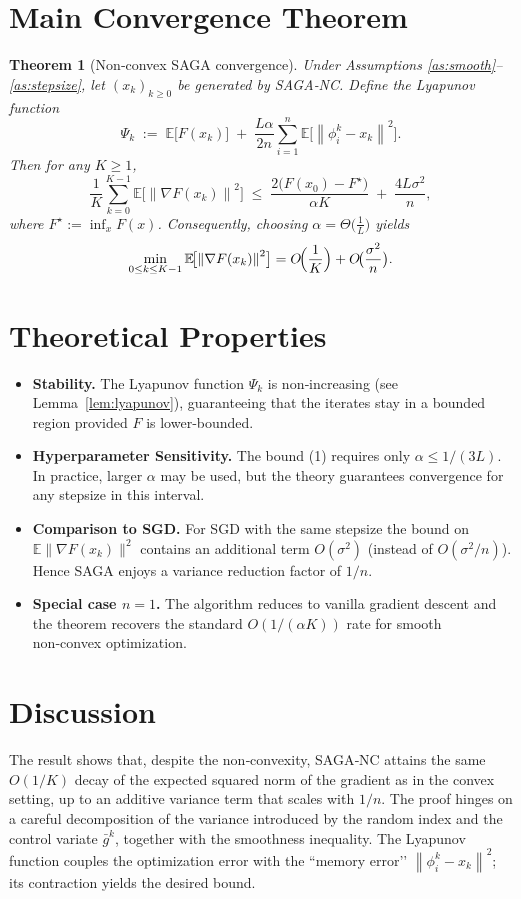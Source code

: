 \documentclass{article}
\newtheorem{theorem}{Theorem}
\newcommand{\E}{\mathbb{E}}
\newcommand{\norm}[1]{\left\lVert#1\right\rVert}
\begin{document}
\section*{Main Convergence Theorem}
\begin{theorem}[Non‑convex SAGA convergence]\label{thm:main}
Under Assumptions \ref{as:smooth}–\ref{as:stepsize}, let $(x_k)_{k\ge0}$ be generated by SAGA‑NC. 
Define the Lyapunov function
\[
\Psi_k \;:=\; \E\!\bigl[F(x_k)\bigr] \;+\; \frac{L\alpha}{2n}\sum_{i=1}^{n}\E\!\bigl[\norm{\phi_i^{k}-x_k}^{2}\bigr].
\]
Then for any $K\ge 1$,
\[
\frac{1}{K}\sum_{k=0}^{K-1}\E\!\bigl[\norm{\nabla F(x_k)}^{2}\bigr]
\;\le\;
\frac{2\bigl(F(x_0)-F^{\star}\bigr)}{\alpha K}
\;+\;
\frac{4L\sigma^{2}}{n},
\tag{1}
\]
where $F^{\star}:=\inf_{x}F(x)$. Consequently, choosing $\alpha=\Theta\!\bigl(\tfrac{1}{L}\bigr)$ yields
\[
\min_{0\le k\le K-1}\E\!\bigl[\norm{\nabla F(x_k)}^{2}\bigr]
= O\!\Bigl(\frac{1}{K}\Bigr)+O\!\bigl(\frac{\sigma^{2}}{n}\bigr).
\]
\end{theorem}

\section*{Theoretical Properties}
\begin{itemize}[leftmargin=*]
    \item \textbf{Stability.} The Lyapunov function $\Psi_k$ is non‑increasing (see Lemma~\ref{lem:lyapunov}), guaranteeing that the iterates stay in a bounded region provided $F$ is lower‑bounded.
    \item \textbf{Hyperparameter Sensitivity.} The bound (1) requires only $\alpha\le 1/(3L)$. In practice, larger $\alpha$ may be used, but the theory guarantees convergence for any stepsize in this interval.
    \item \textbf{Comparison to SGD.} For SGD with the same stepsize the bound on $\E\|\nabla F(x_k)\|^{2}$ contains an additional term $O(\sigma^{2})$ (instead of $O(\sigma^{2}/n)$). Hence SAGA enjoys a variance reduction factor of $1/n$.
    \item \textbf{Special case $n=1$.} The algorithm reduces to vanilla gradient descent and the theorem recovers the standard $O(1/(\alpha K))$ rate for smooth non‑convex optimization.
\end{itemize}

\section*{Discussion}
The result shows that, despite the non‑convexity, SAGA‑NC attains the same $O(1/K)$ decay of the expected squared norm of the gradient as in the convex setting, up to an additive variance term that scales with $1/n$. The proof hinges on a careful decomposition of the variance introduced by the random index and the control variate $\bar g^{k}$, together with the smoothness inequality. The Lyapunov function couples the optimization error with the “memory error’’ $\norm{\phi_i^{k}-x_k}^{2}$; its contraction yields the desired bound.
\end{document}

